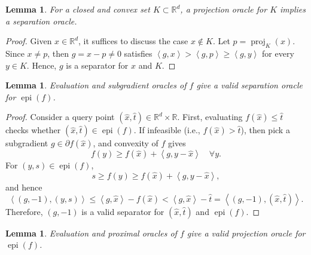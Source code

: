 \documentclass[11pt,letterpaper]{article}
\newcommand{\R}{\mathbb{R}}
\newcommand{\proj}{\operatorname{proj}}
\newcommand{\epi}{\operatorname{epi}}
\newcommand{\inner}[2]{\left\langle #1  ,#2 \right\rangle}
\newtheorem{lemma}[thm]{Lemma}
\begin{document}
\begin{lemma}\label{lem:proj-sep}
    For a closed and convex set $K \subset \R^d$, a projection oracle for $K$ implies a separation oracle.
\end{lemma}

\begin{proof}
    Given $x\in \R^d$, it suffices to discuss the case $x\notin K$. Let $p=\proj_K(x)$. Since $x\ne p$, then $g=x-p \ne 0$ satisfies $\inner{g}{x} > \inner{g}{p} \ge \inner{g}{y}$ for every $y \in K$. Hence, $g$ is a separator for $x$ and $K$.
\end{proof}

\begin{lemma}\label{lem:sep}
    Evaluation and subgradient oracles of $f$ give a valid separation oracle for $\epi(f)$.
\end{lemma}

\begin{proof}
    Consider a query point $(\hat x,\hat t) \in \R^d \times \R$. First, evaluating $f(\hat x)\le \hat t$ checks whether $(\hat x,\hat t)\in \epi(f)$. If infeasible (i.e., $f(\hat x) > \hat t$), then pick a subgradient $g \in \partial f(\hat x)$, and convexity of $f$ gives
    \[
    f(y) \ge f(\hat x)+\inner{g}{y-\hat x} \quad \forall y.
    \]
    For $(y,s) \in \epi(f)$,
    \[
    s\ge f(y) \ge f(\hat x)+\inner{g}{y-\hat x},
    \]
    and hence
    \[
    \inner{(g,-1)}{(y,s)} \le \inner{g}{\hat x} - f(\hat x) < \inner{g}{\hat x} - \hat t = \inner{(g,-1)}{(\hat x,\hat t)}.
    \]
    Therefore, $(g,-1)$ is a valid separator for $(\hat x,\hat t)$ and $\epi(f)$.
\end{proof}

\begin{lemma}\label{lem:proj-epi}
    Evaluation and proximal oracles of $f$ give a valid projection oracle for $\epi(f)$. 
\end{lemma}
\end{document}
